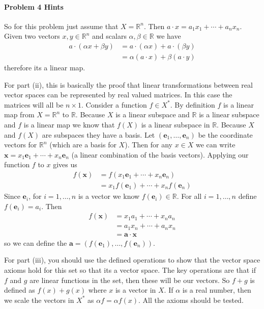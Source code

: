 \documentclass[a4paper,12pt]{article}
\begin{document}
\paragraph{Problem 4 Hints}
So for this problem just assume that $X = \mathbb{R}^n$.
Then $a\cdot x = a_1 x_1 + \cdots + a_n x_n$.
Given two vectors $x,y \in \mathbb{R}^n$ and scalars $\alpha, \beta \in \mathbb{R}$ we have
\begin{align}
	a \cdot (\alpha x + \beta y) &= a\cdot (\alpha x) + a\cdot (\beta y) \nonumber \\
	&= \alpha(a\cdot x) + \beta (a\cdot y) \nonumber 
\end{align}
therefore its a linear map.

For part (ii), this is basically the proof that linear transformations between real vector spaces can be represented by real valued matrices.
In this case the matrices will all be $n\times 1$.
Consider a function $f\in X^*$.
By definition $f$ is a linear map from $X = \mathbb{R}^n$ to $\mathbb{R}$.
Because $X$ is a linear subspace and $\mathbb{R}$ is a linear subspace and $f$ is a linear map we know that $f(X)$ is a linear subspace in $\mathbb{R}$.
Because $X$ and $f(X)$ are subspaces they have a basis.
Let $(\mathbf{e}_1,\dots, \mathbf{e}_n)$ be the coordinate vectors for $\mathbb{R}^n$ (which are a basis for $X$).
Then for any $x\in X$ we can write $\mathbf{x} = x_1 \mathbf{e}_1 + \cdots + x_n \mathbf{e}_n$ (a linear combination of the basis vectors).
Applying our function $f$ to $x$ gives us
\begin{align}
	f(\mathbf{x}) &= f( x_1 \mathbf{e}_1 + \cdots + x_n \mathbf{e}_n ) \nonumber \\
	&= x_1 f(\mathbf{e}_1) + \cdots + x_n f(\mathbf{e}_n) \nonumber
\end{align}
Since $\mathbf{e}_i$, for $i=1,\dots,n$ is a vector we know $f(\mathbf{e}_i) \in \mathbb{R}$.
For all $i = 1,\dots, n$ define $f(\mathbf{e}_i) = a_i$.
Then 
\begin{align}
	f(\mathbf{x}) &= x_1 a_1 + \cdots + x_n a_n \nonumber \\
	&= a_1 x_n + \cdots + a_n x_n \nonumber \\
	&= \mathbf{a} \cdot \mathbf{x} \nonumber
\end{align}
so we can define the $\mathbf{a} = (f(\mathbf{e}_1), \dots, f(\mathbf{e}_n))$.

For part (iii), you should use the defined operations to show that the vector space axioms hold for this set so that its a vector space.
The key operations are that if $f$ and $g$ are linear functions in the set, then these will be our vectors.
So $f + g$ is defined as $f(x) + g(x)$ where $x$ is a vector in $X$.
If $\alpha$ is a real number, then we scale the vectors in $X^*$ as $\alpha f = \alpha f(x)$.
All the axioms should be tested.
\end{document}
